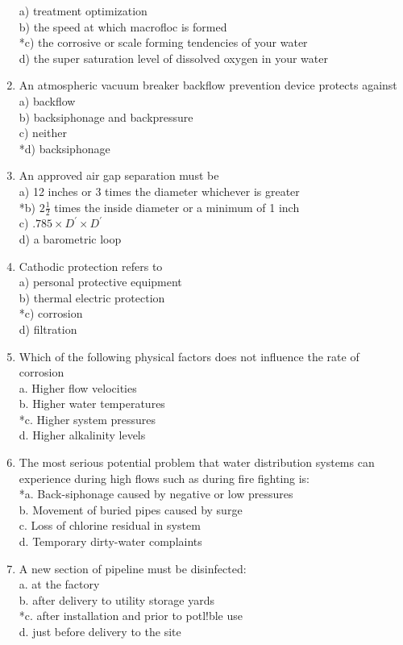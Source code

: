 \begin{enumerate}[1.]
a) treatment optimization\\
b) the speed at which macrofloc is formed\\
*c) the corrosive or scale forming tendencies of your water\\
d) the super saturation level of dissolved oxygen in your water\\
  \item An atmospheric vacuum breaker backflow prevention device protects against\\
a) backflow\\
b) backsiphonage and backpressure\\
c) neither\\
*d) backsiphonage\\
 \item An approved air gap separation must be\\
a) 12 inches or 3 times the diameter whichever is greater\\
*b) $2 \frac{1}{2}$ times the inside diameter or a minimum of 1 inch\\
c) $.785 \times D^{\prime} \times D^{\prime}$\\
d) a barometric loop\\
  \item Cathodic protection refers to\\
a) personal protective equipment\\
b) thermal electric protection\\
*c) corrosion\\
d) filtration\\


\item Which of the following physical factors does not influence the rate of corrosion\\
a.  Higher flow velocities\\
b.  Higher water temperatures\\
*c.  Higher system pressures\\
d.  Higher alkalinity levels\\
\item The most serious potential problem that water distribution systems can experience during high flows such as during fire fighting is:\\
*a.  Back-siphonage caused by negative or low pressures\\
b.  Movement of buried pipes caused by surge\\
c.  Loss of chlorine residual in system\\
d.  Temporary dirty-water complaints\\
\item A new section of pipeline must be disinfected:\\
a.  at the factory\\
b.  after delivery to utility storage yards\\
*c.  after installation and prior to potl!ble use\\
d. just before delivery to the site\\


\end{enumerate}
